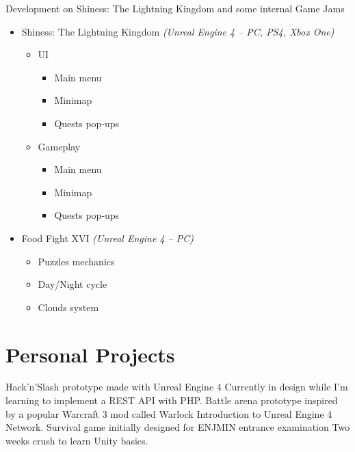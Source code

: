 \documentclass[10pt, a4paper, sans]{moderncv}
\begin{document}
            {Development on Shiness: The Lightning Kingdom and some internal Game Jams}
{
\begin{itemize}
\item Shiness: The Lightning Kingdom \emph{(Unreal Engine 4 -- PC, PS4, Xbox One)}
  \begin{itemize}
    \item UI
    \begin{itemize}
      \item Main menu
      \item Minimap
      \item Quests pop-ups
    \end{itemize}
    \item Gameplay
    \begin{itemize}
      \item Main menu
      \item Minimap
      \item Quests pop-ups
    \end{itemize}
  \end{itemize}
\item Food Fight XVI \emph{(Unreal Engine 4 -- PC)}
  \begin{itemize}
    \item Puzzles mechanics
    \item Day/Night cycle
    \item Clouds system
  \end{itemize}
\end{itemize}}

\section{Personal Projects}

            {Hack'n'Slash prototype made with Unreal Engine 4}
            {Currently in design while I'm learning to implement a REST API with PHP.}
            {Battle arena prototype inspired by a popular Warcraft 3 mod called Warlock}
            {Introduction to Unreal Engine 4 Network.}
            {Survival game initially designed for ENJMIN entrance examination}
            {Two weeks crush to learn Unity basics.}
\end{document}
